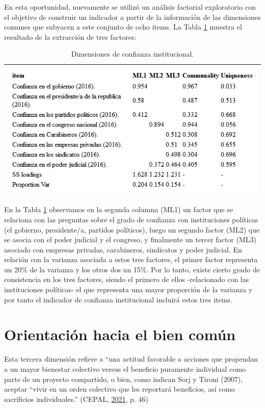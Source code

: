 \documentclass[
  12pt,
]{book}
\begin{document}
En esta oportunidad, nuevamente se utilizó un análisis factorial exploratorio con el objetivo de construir un indicador a partir de la información de las dimensiones comunes que subyacen a este conjunto de ocho items. La Tabla \ref{tab:inst-fa} muestra el resultado de la extracción de tres factores:

\begin{longtable}[]{@{}l@{}}
\caption{\label{tab:inst-fa}Dimensiones de confianza institucional.}\tabularnewline
\toprule
\endhead
\includegraphics[width=8.33333in,height=\textheight]{output/tables/inst_fa.png}\tabularnewline
\bottomrule
\end{longtable}

En la Tabla \ref{tab:inst-fa} observamos en la segunda columna (ML1) un factor que se relaciona con las preguntas sobre el grado de confianza con instituciones políticas (el gobierno, presidente/a, partidos políticos), luego un segundo factor (ML2) que se asocia con el poder judicial y el congreso, y finalmente un tercer factor (ML3) asociado con empresas privadas, carabineros, sindicatos y poder judicial. En relación con la varianza asociada a estos tres factores, el primer factor representa un 20\% de la varianza y los otros dos un 15\%. Por lo tanto, existe cierto grado de consistencia en los tres factores, siendo el primero de ellos -relacionado con las instituciones políticas- el que representa una mayor proporción de la varianza y por tanto el indicador de confianza institucional incluirá estos tres items.

\hypertarget{orientaciuxf3n-hacia-el-bien-comuxfan}{%
\section{Orientación hacia el bien común}\label{orientaciuxf3n-hacia-el-bien-comuxfan}}

Esta tercera dimensión refiere a ``una actitud favorable a acciones que propendan a un mayor bienestar colectivo versus el beneficio puramente individual como parte de un proyecto compartido, o bien, como indican Sorj y Tironi (2007), aceptar ``vivir en un orden colectivo que les reportará beneficios, así como sacrificios individuales.'' (CEPAL, \protect\hyperlink{ref-cepal_cohesion_2021}{2021}, p. 46)
\end{document}
